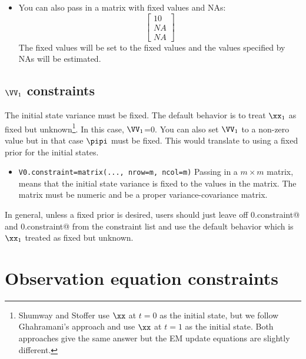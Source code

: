 \begin{itemize}
\item[] You can also pass in a matrix with fixed values and NAs: 
\begin{equation*}
 \left[ \begin{array}{c}
    10 \\
    NA \\
    NA \end{array} \right]
\end{equation*}
The fixed values will be set to the fixed values and the values specified by NAs will be estimated.

\end{itemize}

\subsection{$\VV_1$ constraints}

The initial state variance must be fixed.  The default behavior is to treat $\xx_1$ as fixed but unknown\footnote{Shumway and Stoffer use $\xx$ at $t=0$ as the initial state, but we follow Ghahramani's approach and use $\xx$ at $t=1$ as the initial state. Both approaches give the same answer but the EM update equations are slightly different.}.  In this case, $\VV_1$=0.  You can also set $\VV_1$ to a non-zero value but in that case $\pipi$ must be fixed.  This would translate to using a fixed prior for the initial states.
 \begin{itemize}\itemsep5pt
 \item[] \texttt{V0.constraint=matrix(..., nrow=m, ncol=m)}  Passing in a $m \times m$ matrix, means that the initial state variance is fixed to the values in the matrix. The matrix must be numeric and be a proper variance-covariance matrix.
 \end{itemize}
In general, unless a fixed prior is desired, users should just leave off \verb@x0.constraint@ and \verb@V0.constraint@ from the constraint list and use the default behavior which is $\xx_1$ treated as fixed but unknown.

\section{Observation equation constraints}

